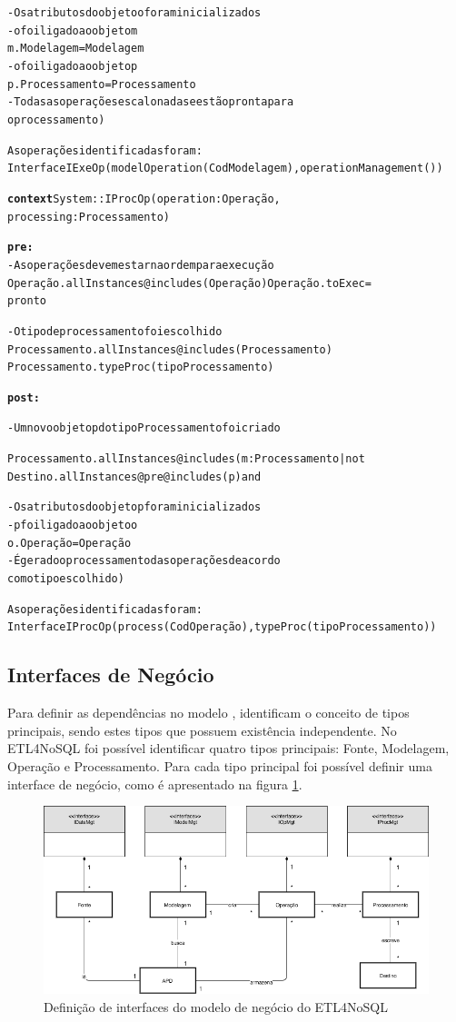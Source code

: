 \begin{alltt}
- Os atributos do objeto o foram inicializados
- o foi ligado ao objeto m
m.Modelagem = Modelagem
- o foi ligado ao objeto p
p.Processamento = Processamento
- Todas as operações escalonadas e estão pronta para 
o processamento)
\hrulefill

\textnormal{As operações identificadas foram:
Interface IExeOp (modelOperation(CodModelagem), operationManagement())}

\hrulefill
\textbf{context} System :: IProcOp (operation: Operação, 
processing: Processamento)

\textbf{pre:}
- As operações devem estar na ordem para execução
Operação.allInstances@includes(Operação) Operação.toExec = 
pronto

- O tipo de processamento foi escolhido
Processamento.allInstances@includes(Processamento) 
Processamento.typeProc(tipoProcessamento)

\textbf{post:}

- Um novo objeto p do tipo Processamento foi criado

Processamento. allInstances@includes (m: Processamento | not 
Destino.allInstances@pre@includes (p) and

- Os atributos do objeto p foram inicializados
- p foi ligado ao objeto o
o.Operação = Operação
- É gerado o processamento das operações de acordo 
com o tipo escolhido)

\hrulefill

\textnormal{As operações identificadas foram:
Interface IProcOp (process(CodOperação), typeProc(tipoProcessamento))}

\end{alltt}


\subsection{Interfaces de Negócio}

Para definir as dependências no modelo \cite{cheesman:2001}, identificam o conceito de tipos principais, sendo estes tipos que possuem existência independente.
No ETL4NoSQL foi possível identificar quatro tipos principais: Fonte, Modelagem, Operação e Processamento. Para cada tipo principal foi possível definir uma interface de negócio, como é apresentado na figura \ref{modelo_negocio}.

\begin{figure}[h]
	\centering
	\includegraphics[scale=0.58]{fig/modelo_negocio.png}
	\caption{Definição de interfaces do modelo de negócio do ETL4NoSQL}
	\label{modelo_negocio}
\end{figure}

